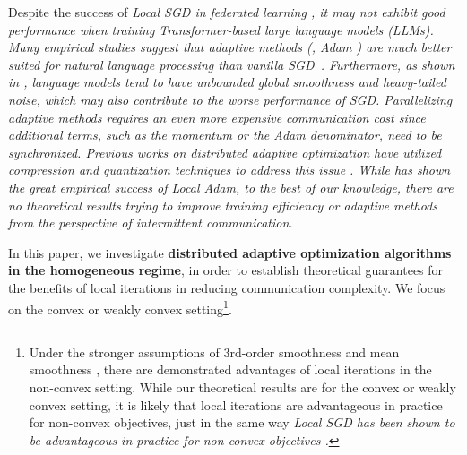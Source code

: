 \documentclass{article} %
\numberwithin{equation}{section}
\begin{document}
Despite the success of \em Local \em  SGD in federated learning \citep{mcmahan2017communication}, it may not exhibit good performance when training Transformer-based large language models (LLMs).
Many empirical studies suggest that adaptive methods (\eg, Adam \citep{kingma2014adam}) are much better suited for natural language processing than vanilla SGD~\citep{goodfellow2016deep, zhang2020adaptive, kunstner2023noise, pan2023toward}.
Furthermore, as shown in \citet{zhang2019gradient, zhang2020adaptive}, language models tend to have unbounded global smoothness and heavy-tailed noise, which may also contribute to the worse performance of SGD. Parallelizing adaptive methods requires an even more expensive communication cost since additional terms, such as the momentum or the Adam denominator, need to be synchronized.
Previous works on distributed adaptive optimization have utilized compression and quantization techniques to address this issue \citep{bernstein2018signsgd, wangni2018gradient, wang2023cocktailsgd}. 
While \citet{douillard2023diloco} has shown the great empirical success of \em Local \em Adam, to the best of our knowledge, there are no theoretical results trying to improve training efficiency or adaptive methods from the perspective of intermittent communication. 

In this paper, we investigate \textbf{distributed adaptive optimization algorithms in the homogeneous regime}, in order to establish theoretical guarantees for the benefits of local iterations in reducing communication complexity. We focus on the convex or weakly convex setting\footnote{Under the stronger assumptions of 3rd-order smoothness \citep{glasgow2022sharp} and mean smoothness \citep{patel2022towards}, there are demonstrated advantages of local iterations in the non-convex setting. While our theoretical results are for the convex or weakly convex setting, it is likely that local iterations are advantageous in practice for non-convex objectives, just in the same way \em Local \em  SGD has been shown to be advantageous in practice for non-convex objectives \citep{mcmahan2017communication}. }.
\end{document}
